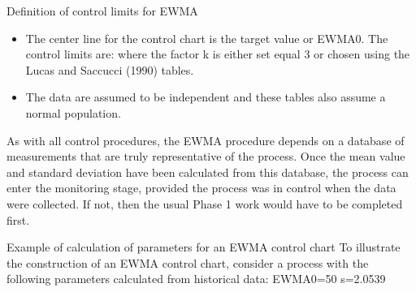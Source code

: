 ﻿\documentclass[Charts101.tex]{subfiles}
\begin{document}
\begin{frame}
\begin{frame}
\begin{frame}
\begin{frame}
\begin{frame}
\begin{frame}
\begin{itemize}
\begin{frame}
Definition of control limits for EWMA	
\begin{itemize}
\item The center line for the control chart is the target value or EWMA0. The control limits are:
where the factor k is either set equal 3 or chosen using the Lucas and Saccucci (1990) tables. 
\item The data are assumed to be independent and these tables also assume a normal population.
\end{itemize}
\end{frame}
\begin{frame}
As with all control procedures, the EWMA procedure depends on a database of measurements that are truly representative of the process. Once the mean value and standard deviation have been calculated from this database, the process can enter the monitoring stage, provided the process was in control when the data were collected. If not, then the usual Phase 1 work would have to be completed first.
\end{frame}
\begin{frame}
Example of calculation of parameters for an EWMA control chart	To illustrate the construction of an EWMA control chart, consider a process with the following parameters calculated from historical data:
EWMA0=50
s=2.0539
\end{frame}
\begin{frame}[fragile]


\end{frame}
\end{itemize}
\end{frame}
\end{frame}
\end{frame}
\end{frame}
\end{frame}
\end{frame}
\end{document}
